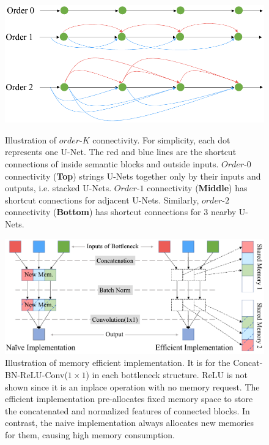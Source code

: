 \begin{figure}[t]
\centering
  \includegraphics[width=0.9\linewidth]{figures/order-k-cropped.pdf}
  \caption{Illustration of $order$-$K$ connectivity. For simplicity, each dot represents one U-Net. The red and blue lines are the shortcut connections of inside semantic blocks and outside inputs. $Order$-$0$ connectivity ({\bf Top}) strings U-Nets together only by their inputs and outputs, i.e. stacked U-Nets. $Order$-$1$ connectivity ({\bf Middle}) has shortcut connections for adjacent U-Nets. Similarly, $order$-$2$ connectivity ({\bf Bottom}) has shortcut connections for 3 nearby U-Nets.}
\label{fig:$order$-$K$-illustr}
\endminipage \hfill
{}
\centering
  \includegraphics[width=0.9\linewidth]{figures/memory-efficient-cropped.pdf}
  \caption{Illustration of memory efficient implementation. It is for the Concat-BN-ReLU-Conv($1\times 1$) in each bottleneck structure. ReLU is not shown since it is an inplace operation with no memory request. The efficient implementation  pre-allocates fixed memory space to store the concatenated and normalized features of connected blocks. In contrast, the naive implementation always allocates new memories for them, causing high memory consumption.}
  \label{fig:memory-efficient} \hfill
\endminipage
\end{figure}

